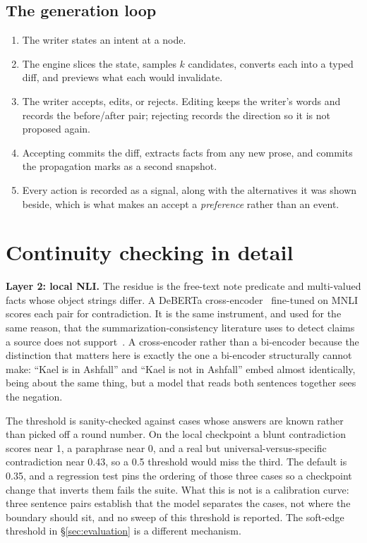 \documentclass{article}
\begin{document}
\subsection{The generation loop}

\begin{enumerate}[label=\arabic*.]
\item The writer states an intent at a node.
\item The engine slices the state, samples $k$ candidates, converts each into a typed diff,
and previews what each would invalidate.
\item The writer accepts, edits, or rejects. Editing keeps the writer's words and records
the before/after pair; rejecting records the direction so it is not proposed again.
\item Accepting commits the diff, extracts facts from any new prose, and commits the
propagation marks as a second snapshot.
\item Every action is recorded as a signal, along with the alternatives it was shown
beside, which is what makes an accept a \emph{preference} rather than an event.
\end{enumerate}



\section{Continuity checking in detail}
\label{app:continuity}

\textbf{Layer 2: local NLI.} The residue is the free-text \textsf{note} predicate and
multi-valued facts whose object strings differ. A DeBERTa
cross-encoder~\cite{he2021deberta} fine-tuned on MNLI scores each pair for contradiction.
It is the same instrument, and used for the same reason, that the summarization-consistency
literature uses to detect claims a source does not support~\cite{laban2022summac}. A cross-encoder rather than a bi-encoder because the
distinction that matters here is exactly the one a bi-encoder structurally cannot make: ``Kael is in
Ashfall'' and ``Kael is not in Ashfall'' embed almost identically, being about the same
thing, but a model that reads both sentences together sees the negation.

The threshold is sanity-checked against cases whose answers are known rather than picked
off a round number. On the local checkpoint a blunt contradiction scores near 1, a
paraphrase near 0, and a real but universal-versus-specific contradiction near 0.43, so a
0.5 threshold would miss the third. The default is 0.35, and a regression test pins the
ordering of those three cases so a checkpoint change that inverts them fails the suite.
What this is not is a calibration curve: three sentence pairs establish that the model
separates the cases, not where the boundary should sit, and no sweep of this threshold is
reported. The soft-edge threshold in \S\ref{sec:evaluation} is a different mechanism.
\end{document}
